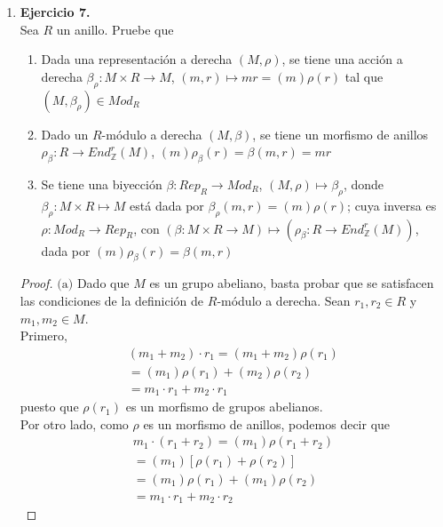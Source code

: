 \documentclass{article}
\newcommand{\lrprth}[1]{
    \left(#1\right)
}
\newcommand{\zend}[2]{
    End_{\mathbb{Z}}^{#2}\lrprth{#1}
}
\theoremstyle{definition}
\theoremstyle{plain}
\theoremstyle{plain}
\theoremstyle{definition}
\theoremstyle{definition}
\theoremstyle{definition}
\theoremstyle{definition}
\theoremstyle{definition}
\theoremstyle{definition}
\begin{document}
\begin{enumerate}
\item \textbf{Ejercicio 7.}\\
Sea $R$ un anillo. Pruebe que
\begin{enumerate}
	\item Dada una representación a derecha $\lrprth{M, \rho}$, se tiene una acción a derecha $\beta_{\rho} : M \times R \longrightarrow M$, $\lrprth{m,r} \mapsto mr=\lrprth{m}\rho\lrprth{r}$ tal que $\lrprth{M, \beta_{\rho}}\in Mod_{R}$
	\item Dado un $R$-módulo a derecha $\lrprth{M, \beta}$, se tiene un morfismo de anillos $\rho_{\beta}:R \longrightarrow \zend{M}{r}$, $\lrprth{m}\rho_{\beta}\lrprth{r}=\beta\lrprth{m,r}=mr$
	\item Se tiene una biyección $\beta :Rep_{R} \longrightarrow Mod_{R}$, $\lrprth{M, \rho}\mapsto\beta_{\rho}$, donde $\beta_{\rho}:M \times R \mapsto M$ está dada por $\beta_{\rho}\lrprth{m,r}=\lrprth{m}\rho\lrprth{r}$; cuya inversa es $\rho :Mod_{R} \longrightarrow Rep_{R}$, con $\lrprth{\beta :M \times R \longrightarrow M}\mapsto\lrprth{\rho_{\beta}:R \longrightarrow\zend{M}{r}}$, dada por $\lrprth{m}\rho_{\beta}\lrprth{r}=\beta\lrprth{m,r}$
\end{enumerate}
\begin{proof}
$\boxed{\text{(a)}}$ Dado que $M$ es un grupo abeliano, basta probar que se satisfacen las condiciones de la definición de $R$-módulo a derecha. Sean $r_{1},r_{2} \in R$ y $m_{1},m_{2} \in M$.\\

Primero,
\begin{align*}
\lrprth{m_{1}+m_{2}} \cdot r_{1}=\lrprth{m_{1}+m_{2}}\rho\lrprth{r_{1}}\\
=\lrprth{m_{1}} \rho \lrprth{r_{1}} + \lrprth{m_{2}} \rho \lrprth{r_{2}}\\
=m_{1} \cdot r_{1} + m_{2} \cdot r_{1}
\end{align*}
puesto que $\rho \lrprth{r_{1}}$ es un morfismo de grupos abelianos.\\
	
Por otro lado, como $\rho$ es un morfismo de anillos, podemos decir que
\begin{align*}
m_{1} \cdot \lrprth{r_{1}+r_{2}}=\lrprth{m_{1}} \rho \lrprth{r_{1}+r_{2}}\\
=\lrprth{m_{1}}[\rho \lrprth{r_{1}} + \rho \lrprth{r_{2}}]\\
=\lrprth{m_{1}} \rho \lrprth{r_{1}} + \lrprth{m_{1}} \rho \lrprth{r_{2}}\\
=m_{1} \cdot r_{1} + m_{2} \cdot r_{2}
\end{align*}


\end{proof}
\end{enumerate}
\end{document}
